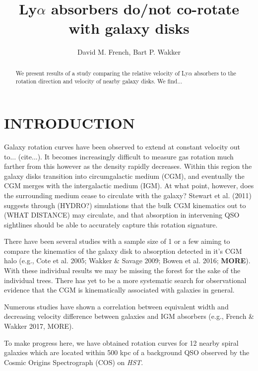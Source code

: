 \documentclass[iop]{emulateapj-rtx4}
\begin{document}
\title{Ly$\alpha$ absorbers do/not co-rotate with galaxy disks}

\author{David M. French, Bart P. Wakker}


\begin{abstract}

We present results of a study comparing the relative velocity of Ly$\alpha$ absorbers to the rotation direction and velocity of nearby galaxy disks. We find...

\end{abstract}




\section{INTRODUCTION}
Galaxy rotation curves have been observed to extend at constant velocity out to... (cite...). It becomes increasingly difficult to measure gas rotation much farther from this however as the density rapidly decreases. Within this region the galaxy disks transition into circumgalactic medium (CGM), and eventually the CGM merges with the intergalactic medium (IGM). At what point, however, does the surrounding medium cease to circulate with the galaxy? Stewart et al. (2011) suggests through (HYDRO?) simulations that the bulk CGM kinematics out to (WHAT DISTANCE) may circulate, and that absorption in intervening QSO sightlines should be able to accurately capture this rotation signature.

There have been several studies with a sample size of 1 or a few aiming to compare the kinematics of the galaxy disk to absorption detected in it's CGM halo (e.g., Cote et al. 2005; Wakker \& Savage 2009; Bowen et al. 2016; \textbf{MORE}). With these individual results we may be missing the forest for the sake of the individual trees. There has yet to be a more systematic search for observational evidence that the CGM is kinematically associated with galaxies in general.

Numerous studies have shown a correlation between equivalent width and decreasing velocity difference between galaxies and IGM absorbers (e.g., French \& Wakker 2017, MORE).

To make progress here, we have obtained rotation curves for 12 nearby spiral galaxies which are located within 500 kpc of a background QSO observed by the Cosmic Origins Spectrograph (COS) on \textit{HST}. 
\end{document}
